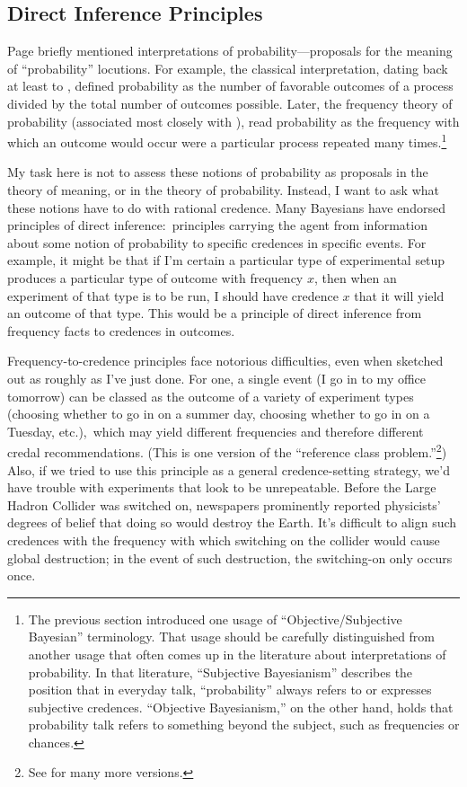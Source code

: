 \subsection{Direct Inference Principles} \label{ss:direct}

Page \pageref{titelbaum-interpretations} briefly mentioned interpretations of probability---proposals for the meaning of ``probability'' locutions. For example, the classical interpretation, dating back at least to \citet{LaplaceEssay}, defined probability as the number of favorable outcomes of a process divided by the total number of outcomes possible. Later, the frequency theory of probability (associated most closely with \citealp{vonMisesProbability}), read probability as the frequency with which an outcome would occur were a particular process repeated many times.\footnote
{The previous section introduced one usage of ``Objective/Subjective Bayesian'' terminology. That usage should be carefully distinguished from another usage that often comes up in the literature about interpretations of probability.  In that literature, ``Subjective Bayesianism'' describes the position that in everyday talk, ``probability'' always refers to or expresses subjective credences. ``Objective Bayesianism,'' on the other hand, holds that probability talk refers to something beyond the subject, such as frequencies or chances.}

My task here is not to assess these notions of probability as proposals in the theory of meaning, or in the theory of probability. Instead, I want to ask what these notions have to do with rational credence. Many Bayesians have endorsed principles of direct inference:\ principles carrying the agent from information about some notion of probability to specific credences in specific events. For example, it might be that if I'm certain a particular type of experimental setup produces a particular type of outcome with frequency $x$, then when an experiment of that type is to be run, I should have credence $x$ that it will yield an outcome of that type. This would be a principle of direct inference from frequency facts to credences in outcomes.

Frequency-to-credence principles face notorious difficulties, even when sketched out as roughly as I've just done. For one, a single event (I go in to my office tomorrow) can be classed as the outcome of a variety of experiment types (choosing whether to go in on a summer day, choosing whether to go in on a Tuesday, etc.),\ which may yield different frequencies and therefore different credal recommendations. (This is one version of the ``reference class problem.''\footnote
{See \citet{HajekReference} for many more versions.}) Also, if we tried to use this principle as a general credence-setting strategy, we'd have trouble with experiments that look to be unrepeatable. Before the Large Hadron Collider was switched on, newspapers prominently reported physicists' degrees of belief that doing so would destroy the Earth. It's difficult to align such credences with the frequency with which switching on the collider would cause global destruction; in the event of such destruction, the switching-on only occurs once.

